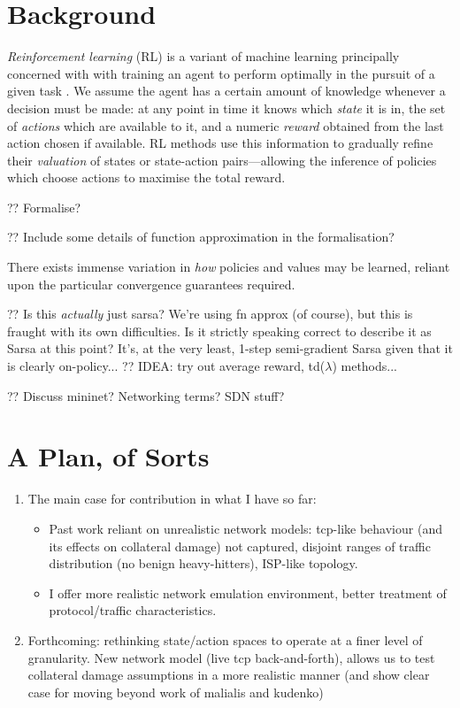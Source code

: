 \documentclass[conference, letterpaper, 10pt, times]{IEEEtran}
\begin{document}
\section{Background}

\emph{Reinforcement learning} (RL) is a variant of machine learning principally concerned with with training an agent to perform optimally in the pursuit of a given task \cite{RL2E}.
We assume the agent has a certain amount of knowledge whenever a decision must be made: at any point in time it knows which \emph{state} it is in, the set of \emph{actions} which are available to it, and a numeric \emph{reward} obtained from the last action chosen if available.
RL methods use this information to gradually refine their \emph{valuation} of states or state-action pairs---allowing the inference of policies which choose actions to maximise the total reward.

?? Formalise?

?? Include some details of function approximation in the formalisation?

There exists immense variation in \emph{how} policies and values may be learned, reliant upon the particular convergence guarantees required.

?? Is this \emph{actually} just sarsa? We're using fn approx (of course), but this is fraught with its own difficulties. Is it strictly speaking correct to describe it as Sarsa at this point? It's, at the very least, 1-step semi-gradient Sarsa given that it is clearly on-policy...
?? IDEA: try out average reward, td($\lambda$) methods...

?? Discuss mininet? Networking terms? SDN stuff?

\section{A Plan, of Sorts}

\begin{enumerate}
	\item The main case for contribution in what I have so far:
	\begin{itemize}
		\item Past work reliant on unrealistic network models: tcp-like behaviour (and its effects on collateral damage) not captured, disjoint ranges of traffic distribution (no benign heavy-hitters), ISP-like topology.
		\item I offer more realistic network emulation environment, better treatment of protocol/traffic characteristics.
	\end{itemize}
	\item Forthcoming: rethinking state/action spaces to operate at a finer level of granularity. New network model (live tcp back-and-forth), allows us to test collateral damage assumptions in a more realistic manner (and show clear case for moving beyond work of malialis and kudenko)
\end{enumerate}
\end{document}
